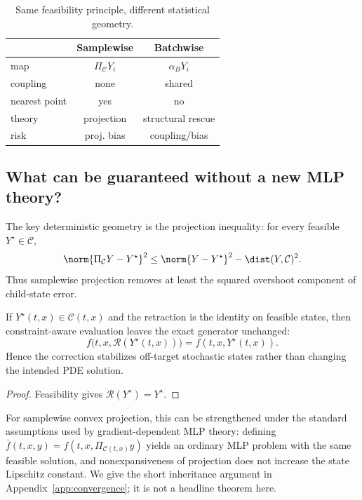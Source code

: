 \begin{table}[t]
\caption{Same feasibility principle, different statistical geometry.}
\label{tab:methods}
\centering\small
\begin{tabular}{@{}lcc@{}}
\toprule
& Samplewise & Batchwise\\
\midrule
map & $\Pi_{\mathcal C}Y_i$ & $\alpha_BY_i$\\
coupling & none & shared\\
nearest point & yes & no\\
theory & projection & structural rescue\\
risk & proj. bias & coupling/bias\\
\bottomrule
\end{tabular}
\end{table}

\subsection{What can be guaranteed without a new MLP theory?}
The key deterministic geometry is the projection inequality: for every feasible $Y^\star\in\mathcal C$,
\begin{equation}
\norm{\Pi_{\mathcal C}Y-Y^\star}^2
\le \norm{Y-Y^\star}^2-\dist(Y,\mathcal C)^2.
\label{eq:pyth}
\end{equation}
Thus samplewise projection removes at least the squared overshoot component of child-state error.

\begin{proposition}
\label{prop:target}
If $Y^\star(t,x)\in\mathcal C(t,x)$ and the retraction is the identity on feasible states, then constraint-aware evaluation leaves the exact generator unchanged:
\[
f\bigl(t,x,\mathcal R(Y^\star(t,x))\bigr)=f(t,x,Y^\star(t,x)).
\]
Hence the correction stabilizes off-target stochastic states rather than changing the intended PDE solution.
\end{proposition}
\begin{proof}
Feasibility gives $\mathcal R(Y^\star)=Y^\star$.
\end{proof}

For samplewise convex projection, this can be strengthened under the standard assumptions used by gradient-dependent MLP theory: defining $\bar f(t,x,y)=f(t,x,\Pi_{\mathcal C(t,x)}y)$ yields an ordinary MLP problem with the same feasible solution, and nonexpansiveness of projection does not increase the state Lipschitz constant. We give the short inheritance argument in Appendix~\ref{app:convergence}; it is not a headline theorem here.

